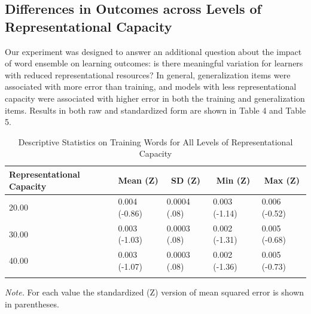\documentclass[
  ,man,floatsintext]{apa6}
\begin{document}
\subsection{Differences in Outcomes across Levels of Representational Capacity}\label{differences-in-outcomes-across-levels-of-representational-capacity}

Our experiment was designed to answer an additional question about the impact of word ensemble on learning outcomes: is there meaningful variation for learners with reduced representational resources? In general, generalization items were associated with more error than training, and models with less representational capacity were associated with higher error in both the training and generalization items. Results in both raw and standardized form are shown in Table 4 and Table 5.

\begin{table}[tbp]

\begin{center}
\begin{threeparttable}

\caption{\label{tab:table4}Descriptive Statistics on Training Words for All Levels of Representational Capacity}

\begin{tabular}{lllll}
\toprule
Representational Capacity & \multicolumn{1}{c}{Mean (Z)} & \multicolumn{1}{c}{SD (Z)} & \multicolumn{1}{c}{Min (Z)} & \multicolumn{1}{c}{Max (Z)}\\
\midrule
20.00 & 0.004 (-0.86) & 0.0004 (.08) & 0.003 (-1.14) & 0.006 (-0.52)\\
30.00 & 0.003 (-1.03) & 0.0003 (.08) & 0.002 (-1.31) & 0.005 (-0.68)\\
40.00 & 0.003 (-1.07) & 0.0003 (.08) & 0.002 (-1.36) & 0.005 (-0.73)\\
\bottomrule
\addlinespace
\end{tabular}

\begin{tablenotes}[para]
\normalsize{\textit{Note.} For each value the standardized (Z) version of mean squared error is shown in parentheses.}
\end{tablenotes}

\end{threeparttable}
\end{center}

\end{table}
\end{document}
